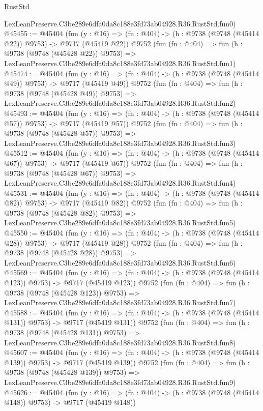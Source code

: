 \begin{lexlean}{RustStd}
\begin{coremodule}
    LexLeanPreserve.C3be289e6dfa0da8c188e3fd73ab04928.R36.RustStd.fun0)
@45455 := @45404
    (fun (y : @16) => (fn : @404) -> (h : @9738 (@9748 (@45414 @22)) @9753) -> @9717 (@45419 @22))
    @9752
    (fun (fn : @404) =>
    fun (h : @9738 (@9748 (@45428 @22)) @9753) =>
    LexLeanPreserve.C3be289e6dfa0da8c188e3fd73ab04928.R36.RustStd.fun1)
@45474 := @45404
    (fun (y : @16) => (fn : @404) -> (h : @9738 (@9748 (@45414 @49)) @9753) -> @9717 (@45419 @49))
    @9752
    (fun (fn : @404) =>
    fun (h : @9738 (@9748 (@45428 @49)) @9753) =>
    LexLeanPreserve.C3be289e6dfa0da8c188e3fd73ab04928.R36.RustStd.fun2)
@45493 := @45404
    (fun (y : @16) => (fn : @404) -> (h : @9738 (@9748 (@45414 @57)) @9753) -> @9717 (@45419 @57))
    @9752
    (fun (fn : @404) =>
    fun (h : @9738 (@9748 (@45428 @57)) @9753) =>
    LexLeanPreserve.C3be289e6dfa0da8c188e3fd73ab04928.R36.RustStd.fun3)
@45512 := @45404
    (fun (y : @16) => (fn : @404) -> (h : @9738 (@9748 (@45414 @67)) @9753) -> @9717 (@45419 @67))
    @9752
    (fun (fn : @404) =>
    fun (h : @9738 (@9748 (@45428 @67)) @9753) =>
    LexLeanPreserve.C3be289e6dfa0da8c188e3fd73ab04928.R36.RustStd.fun4)
@45531 := @45404
    (fun (y : @16) => (fn : @404) -> (h : @9738 (@9748 (@45414 @82)) @9753) -> @9717 (@45419 @82))
    @9752
    (fun (fn : @404) =>
    fun (h : @9738 (@9748 (@45428 @82)) @9753) =>
    LexLeanPreserve.C3be289e6dfa0da8c188e3fd73ab04928.R36.RustStd.fun5)
@45550 := @45404
    (fun (y : @16) => (fn : @404) -> (h : @9738 (@9748 (@45414 @28)) @9753) -> @9717 (@45419 @28))
    @9752
    (fun (fn : @404) =>
    fun (h : @9738 (@9748 (@45428 @28)) @9753) =>
    LexLeanPreserve.C3be289e6dfa0da8c188e3fd73ab04928.R36.RustStd.fun6)
@45569 := @45404
    (fun (y : @16) => (fn : @404) -> (h : @9738 (@9748 (@45414 @123)) @9753) -> @9717 (@45419 @123))
    @9752
    (fun (fn : @404) =>
    fun (h : @9738 (@9748 (@45428 @123)) @9753) =>
    LexLeanPreserve.C3be289e6dfa0da8c188e3fd73ab04928.R36.RustStd.fun7)
@45588 := @45404
    (fun (y : @16) => (fn : @404) -> (h : @9738 (@9748 (@45414 @131)) @9753) -> @9717 (@45419 @131))
    @9752
    (fun (fn : @404) =>
    fun (h : @9738 (@9748 (@45428 @131)) @9753) =>
    LexLeanPreserve.C3be289e6dfa0da8c188e3fd73ab04928.R36.RustStd.fun8)
@45607 := @45404
    (fun (y : @16) => (fn : @404) -> (h : @9738 (@9748 (@45414 @139)) @9753) -> @9717 (@45419 @139))
    @9752
    (fun (fn : @404) =>
    fun (h : @9738 (@9748 (@45428 @139)) @9753) =>
    LexLeanPreserve.C3be289e6dfa0da8c188e3fd73ab04928.R36.RustStd.fun9)
@45626 := @45404
    (fun (y : @16) => (fn : @404) -> (h : @9738 (@9748 (@45414 @148)) @9753) -> @9717 (@45419 @148))

\end{coremodule}
\end{lexlean}
